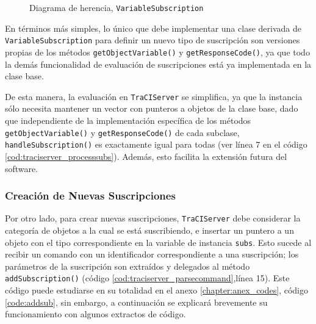 \begin{figure}[h]
    \centering
    
    \caption{Diagrama de herencia, \texttt{VariableSubscription}}
    \label{fig:cd_variablesub}
\end{figure}

En términos más simples, lo único que debe implementar una clase derivada de \texttt{VariableSubscription} para definir un nuevo tipo de suscripción son versiones propias de los métodos \texttt{getObjectVariable()} y \texttt{getResponseCode()}, ya que todo la demás funcionalidad de evaluación de suscripciones está ya implementada en la clase base. 

De esta manera, la evaluación en \texttt{TraCIServer} se simplifica, ya que la instancia sólo necesita mantener un vector con punteros a objetos de la clase base, dado que independiente de la implementación específica de los métodos \texttt{getObjectVariable()} y \texttt{getResponseCode()} de cada subclase, \texttt{handleSubscription()} es exactamente igual para todas (ver línea 7 en el código \ref{cod:traciserver_processsubs}). Además, esto facilita la extensión futura del software.



\subsubsection{Creación de Nuevas Suscripciones}

Por otro lado, para crear nuevas suscripciones, \texttt{TraCIServer} debe considerar la categoría de objetos a la cual se está suscribiendo, e insertar un puntero a un objeto con el tipo correspondiente en la variable de instancia \texttt{subs}. Esto sucede al recibir un comando con un identificador correspondiente a una suscripción; los parámetros de la suscripción son extraídos y delegados al método \texttt{addSubscription()} (código \ref{cod:traciserver_parsecommand},línea 15). Este código puede estudiarse en su totalidad en el anexo \ref{chapter:anex_codes}, código \ref{code:addsub}, sin embargo, a continuación se explicará brevemente su funcionamiento con algunos extractos de código.

